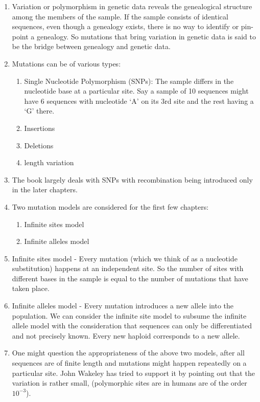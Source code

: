 \documentclass[
]{book}
\providecommand{\tightlist}{%
  \setlength{\itemsep}{0pt}\setlength{\parskip}{0pt}}
\theoremstyle{definition}
\theoremstyle{definition}
\theoremstyle{definition}
\theoremstyle{definition}
\theoremstyle{remark}
\begin{document}
\begin{enumerate}
\def\labelenumi{\arabic{enumi}.}
\item
  Variation or polymorphism in genetic data reveals the genealogical structure among the members of the sample. If the sample consists of identical sequences, even though a genealogy exists, there is no way to identify or pin-point a genealogy. So mutations that bring variation in genetic data is said to be the bridge between genealogy and genetic data.
\item
  Mutations can be of various types:

  \begin{enumerate}
  \def\labelenumii{\alph{enumii}.}
  \tightlist
  \item
    Single Nucleotide Polymorphism (SNPs): The sample differs in the nucleotide base at a particular site. Say a sample of 10 sequences might have 6 sequences with nucleotide `A' on its 3rd site and the rest having a `G' there.
  \item
    Insertions
  \item
    Deletions
  \item
    length variation
  \end{enumerate}
\item
  The book largely deals with SNPs with recombination being introduced only in the later chapters.
\item
  Two mutation models are considered for the first few chapters:

  \begin{enumerate}
  \def\labelenumii{\alph{enumii}.}
  \tightlist
  \item
    Infinite sites model
  \item
    Infinite alleles model
  \end{enumerate}
\item
  Infinite sites model - Every mutation (which we think of as a nucleotide substitution) happens at an independent site. So the number of sites with different bases in the sample is equal to the number of mutations that have taken place.
\item
  Infinite alleles model - Every mutation introduces a new allele into the population. We can consider the infinite site model to subsume the infinite allele model with the consideration that sequences can only be differentiated and not precisely known. Every new haploid corresponds to a new allele.
\item
  One might question the appropriateness of the above two models, after all sequences are of finite length and mutations might happen repeatedly on a particular site. John Wakeley has tried to support it by pointing out that the variation is rather small, (polymorphic sites are in humans are of the order \(10^{-3}\)).
\end{enumerate}
\end{document}
